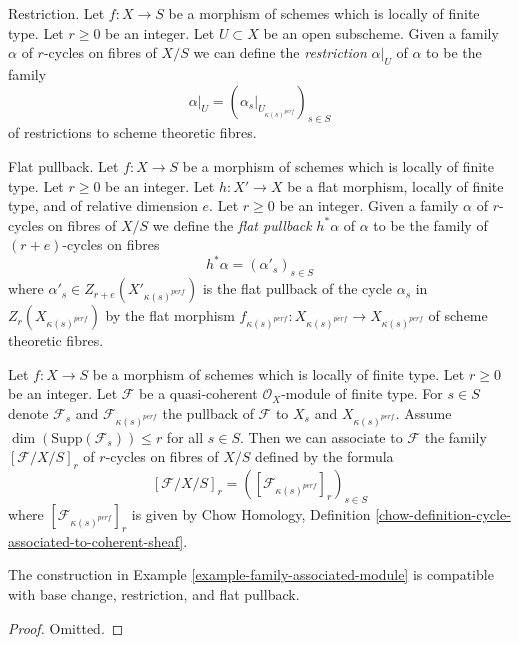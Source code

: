 \medskip\noindent
Restriction. Let $f : X \to S$ be a morphism of schemes which is locally
of finite type. Let $r \geq 0$ be an integer. Let $U \subset X$ be an open
subscheme. Given a family $\alpha$ of $r$-cycles on fibres of $X/S$
we can define the {\it restriction} $\alpha|_U$ of $\alpha$ to be the family
$$
\alpha|_U = (\alpha_s|_{U_{\kappa(s)^{perf}}})_{s \in S}
$$
of restrictions to scheme theoretic fibres.

\medskip\noindent
Flat pullback. Let $f : X \to S$ be a morphism of schemes which is locally
of finite type. Let $r \geq 0$ be an integer. Let $h : X' \to X$ be a
flat morphism, locally of finite type, and of relative dimension $e$.
Let $r \geq 0$ be an integer. Given a family $\alpha$ of $r$-cycles
on fibres of $X/S$ we define the {\it flat pullback} $h^*\alpha$ of $\alpha$
to be the family of $(r + e)$-cycles on fibres
$$
h^*\alpha = (\alpha'_s)_{s \in S}
$$
where $\alpha'_s \in Z_{r + e}(X'_{\kappa(s)^{perf}})$ is the flat pullback
of the cycle $\alpha_s$ in $Z_r(X_{\kappa(s)^{perf}})$ by the flat morphism
$f_{\kappa(s)^{perf}} : X_{\kappa(s)^{perf}} \to X_{\kappa(s)^{perf}}$
of scheme theoretic fibres.

\begin{example}
\label{example-family-associated-module}
Let $f : X \to S$ be a morphism of schemes which is locally of finite type.
Let $r \geq 0$ be an integer. Let $\mathcal{F}$ be a quasi-coherent
$\mathcal{O}_X$-module of finite type. For $s \in S$ denote $\mathcal{F}_s$
and $\mathcal{F}_{\kappa(s)^{perf}}$
the pullback of $\mathcal{F}$ to $X_s$ and $X_{\kappa(s)^{perf}}$.
Assume $\dim(\text{Supp}(\mathcal{F}_s)) \leq r$ for all $s \in S$.
Then we can associate to $\mathcal{F}$ the family $[\mathcal{F}/X/S]_r$ of
$r$-cycles on fibres of $X/S$ defined by the formula
$$
[\mathcal{F}/X/S]_r = ([\mathcal{F}_{\kappa(s)^{perf}}]_r)_{s \in S}
$$
where $[\mathcal{F}_{\kappa(s)^{perf}}]_r$ is given by
Chow Homology, Definition
\ref{chow-definition-cycle-associated-to-coherent-sheaf}.
\end{example}

\begin{lemma}
\label{lemma-family-associated-module}
The construction in Example \ref{example-family-associated-module}
is compatible with base change, restriction,
and flat pullback.
\end{lemma}

\begin{proof}
Omitted.
\end{proof}

